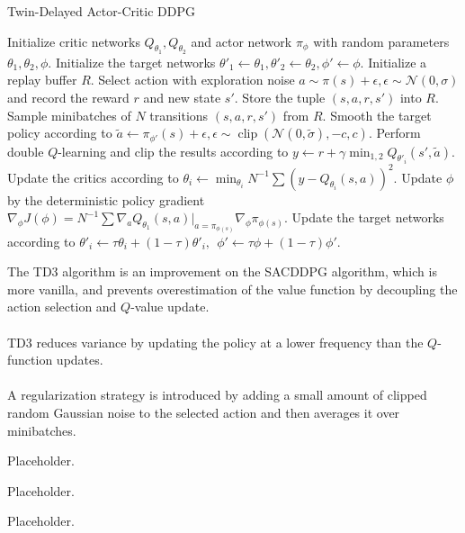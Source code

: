 \documentclass[landscape,a0paper,fontscale=0.292]{baposter}
\DeclareMathOperator{\Clip}{clip}
\begin{document}
\begin{poster}
{
	\begin{algorithm}[H]
		\caption{Twin-Delayed Actor-Critic DDPG}
		\begin{algorithmic}[1]
			\STATE Initialize critic networks $Q_{\theta_1}, Q_{\theta_2}$ and actor network $\pi_{\phi}$ with random parameters
			$\theta_1, \theta_2, \phi$. 
			\STATE Initialize the target networks $\theta'_1 \leftarrow \theta_1, \theta'_2 \leftarrow \theta_2, \phi' \leftarrow \phi$.
			\STATE Initialize a replay buffer $R$.
				\STATE Select action with exploration noise $a \sim \pi(s) + \epsilon, \epsilon \sim \mathcal{N}(0, \sigma)$ and record the reward $r$ and new state $s'$. 
				\STATE Store the tuple $(s, a, r, s')$ into $R$. 
				\STATE Sample minibatches of $N$ transitions $(s, a, r, s')$ from $R$.
				\STATE Smooth the target policy according to $\tilde{a} \leftarrow \pi_{\phi'}(s) + \epsilon, \epsilon \sim \Clip(\mathcal{N}(0, \tilde{\sigma}), -c, c)$.
				\STATE Perform double $Q$-learning and clip the results according to $y \leftarrow r + \gamma \min_{1,2}Q_{\theta'_i}(s', \tilde{a})$. 
				\STATE Update the critics according to $\theta_i \leftarrow \min_{\theta_i}N^{-1}\sum(y - Q_{\theta_i}(s, a))^2$.
					\STATE Update $\phi$ by the deterministic policy gradient $\nabla_{\phi}J(\phi) = N^{-1}\sum\nabla_a Q_{\theta_1}(s,a)\big|_{a = \pi_{\phi(s)}}\nabla_{\phi}\pi_{\phi(s)}$.
					\STATE Update the target networks according to $\theta'_i \leftarrow \tau\theta_i + (1-\tau)\theta'_i, \:\: \phi' \leftarrow \tau\phi + (1-\tau)\phi'$.
				\ENDIF 
			\ENDFOR
		\end{algorithmic}	
	\end{algorithm}

	The TD3 algorithm is an improvement on the SACDDPG algorithm, which is more vanilla, and prevents overestimation of the value function by decoupling the action selection and $Q$-value update. 
	\\ \\
	TD3 reduces variance by updating the policy at a lower frequency than the $Q$-function updates. 
	\\ \\
	A regularization strategy is introduced by adding a small amount of clipped random Gaussian noise to the selected action and then averages it over minibatches. 
}

{
	Placeholder.
}

{
	Placeholder.
}

{
	Placeholder.
}

{
	\nocite{*}
	
	
}
\end{poster}
\end{document}
